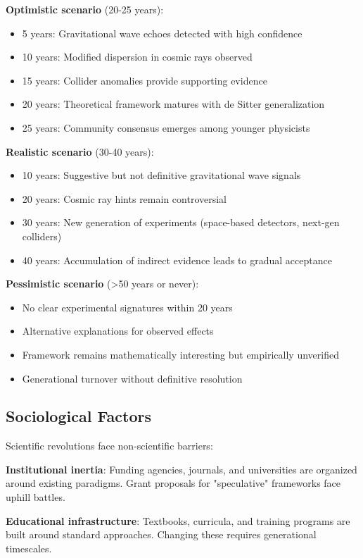 \documentclass[12pt,twocolumn]{article}
\theoremstyle{definition}
\theoremstyle{remark}
\begin{document}
\textbf{Optimistic scenario} (20-25 years):
\begin{itemize}
\item 5 years: Gravitational wave echoes detected with high confidence
\item 10 years: Modified dispersion in cosmic rays observed
\item 15 years: Collider anomalies provide supporting evidence
\item 20 years: Theoretical framework matures with de Sitter generalization
\item 25 years: Community consensus emerges among younger physicists
\end{itemize}

\textbf{Realistic scenario} (30-40 years):
\begin{itemize}
\item 10 years: Suggestive but not definitive gravitational wave signals
\item 20 years: Cosmic ray hints remain controversial
\item 30 years: New generation of experiments (space-based detectors, next-gen colliders)
\item 40 years: Accumulation of indirect evidence leads to gradual acceptance
\end{itemize}

\textbf{Pessimistic scenario} (>50 years or never):
\begin{itemize}
\item No clear experimental signatures within 20 years
\item Alternative explanations for observed effects
\item Framework remains mathematically interesting but empirically unverified
\item Generational turnover without definitive resolution
\end{itemize}

\subsection{Sociological Factors}

Scientific revolutions face non-scientific barriers:

\textbf{Institutional inertia}: Funding agencies, journals, and universities are organized around existing paradigms. Grant proposals for "speculative" frameworks face uphill battles.

\textbf{Educational infrastructure}: Textbooks, curricula, and training programs are built around standard approaches. Changing these requires generational timescales.
\end{document}
